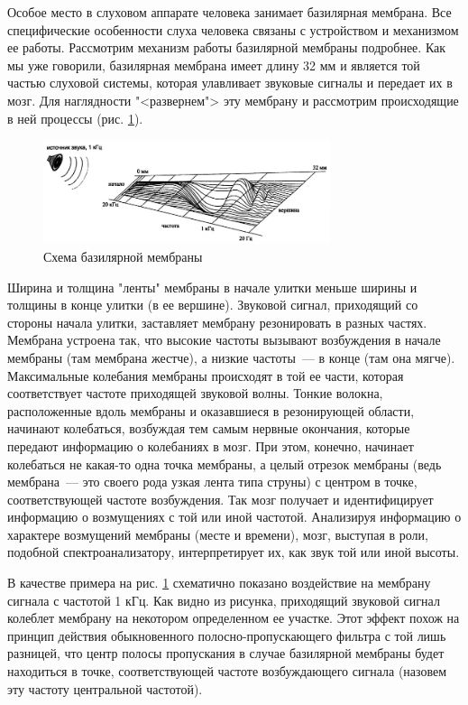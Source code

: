 \documentclass[oneside, final, 14pt]{extreport}
\begin{document}
Особое место в слуховом аппарате человека занимает базилярная мембрана. Все специфические особенности слуха человека связаны с устройством и механизмом ее работы. Рассмотрим механизм работы базилярной мембраны подробнее.
Как мы уже говорили, базилярная мембрана имеет длину 32 мм и является той частью слуховой системы, которая улавливает звуковые сигналы и передает их в мозг. Для наглядности "<развернем"> эту мембрану и рассмотрим происходящие в ней процессы (рис. \ref{pic-ear-02}).

\begin{figure}
\centering
\includegraphics[width=0.75\textwidth]{pic-ear-02}
\caption{Схема базилярной мембраны}
\label{pic-ear-02}
\end{figure}

Ширина и толщина "ленты" мембраны в начале улитки меньше ширины и толщины в конце улитки (в ее вершине). Звуковой сигнал, приходящий со стороны начала улитки, заставляет мембрану резонировать в разных частях. Мембрана устроена так, что высокие частоты вызывают возбуждения в начале мембраны (там мембрана жестче), а низкие частоты~--- в конце (там она мягче). Максимальные колебания мембраны происходят в той ее части, которая соответствует частоте приходящей звуковой волны. Тонкие волокна, расположенные вдоль мембраны и оказавшиеся в резонирующей области, начинают колебаться, возбуждая тем самым нервные окончания, которые передают информацию о колебаниях в мозг. При
этом, конечно, начинает колебаться не какая-то одна точка мембраны, а целый отрезок мембраны (ведь мембрана~--- это своего рода узкая лента типа струны) с центром в точке, соответствующей частоте возбуждения. Так мозг получает и идентифицирует информацию о возмущениях с той или иной частотой. Анализируя информацию о характере возмущений мембраны (месте и времени), мозг, выступая в роли, подобной спектроанализатору, интерпретирует их, как звук той или иной высоты.

В качестве примера на рис. \ref{pic-ear-02} схематично показано воздействие на мембрану сигнала с частотой 1 кГц. Как видно из рисунка, приходящий звуковой сигнал колеблет мембрану на некотором определенном ее участке. Этот эффект похож на принцип действия обыкновенного полосно-пропускающего фильтра с той лишь разницей, что центр полосы пропускания в случае базилярной мембраны будет находиться в точке, соответствующей частоте возбуждающего сигнала (назовем эту частоту центральной частотой). 
\end{document}
